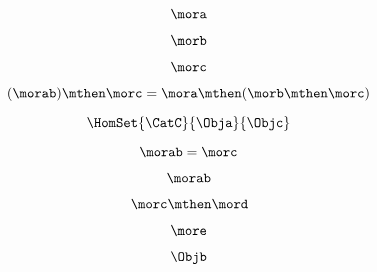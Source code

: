\begin{forslides}
        
         \begin{equation}
            \label{eq:semicats-slides-101}
            \mora
        \end{equation}
        
        
        
         \begin{equation}
            \label{eq:semicats-slides-102}
            \morb
        \end{equation}
        
        
         \begin{equation}
            \label{eq:semicats-slides-103}
            \morc
        \end{equation}
        
        
         \begin{equation}
            \label{eq:semicats-slides-104}
            (\morab) \mthen \morc = \mora \mthen (\morb \mthen \morc)
        \end{equation}
        
        
         \begin{equation}
            \label{eq:semicats-slides-105}
            \HomSet{\CatC}{\Obja}{\Objc}
        \end{equation}
        
        
         \begin{equation}
            \label{eq:semicats-slides-106}
            \morab = \morc
        \end{equation}
        
        
         \begin{equation}
            \label{eq:semicats-slides-107}
            \morab
        \end{equation}
        
        
         \begin{equation}
            \label{eq:semicats-slides-108}
            \morc \mthen \mord
        \end{equation}
        
        
         \begin{equation}
            \label{eq:semicats-slides-109}
            \more
        \end{equation}
        
        
         \begin{equation}
            \label{eq:semicats-slides-110}
            \Objb
        \end{equation}
        

\end{forslides}
